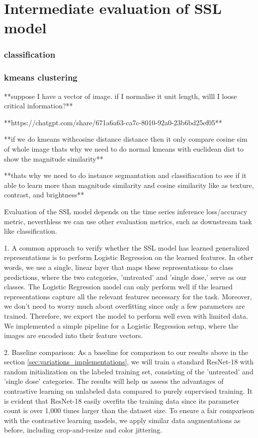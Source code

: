 \section{Intermediate evaluation of SSL model}

\subsubsection{classification}
\subsubsection{kmeans clustering}


**suppose I have a vector of image. if I normalise it unit length, willl I loose critical information?**

**https://chatgpt.com/share/671a6a63-ca7c-8010-92a0-23b6bd25ef05**

**if we do kmeans withcosine distance distance then it only compare cosine sim of whole image thats why we need to do normal kmeans with euclidean dist to show the magnitude similarity** 

**thats why we need to do instance segmantation and classifiacation to see if it able to learn more than magnitude similarity and cosine similarity like as texture, contrast, and brightness**

Evaluation of the SSL model depends on the  time series inference loss/accuracy metric, neverthless we can use other evaluation metrics, such as downstream task like classification. 

1. A common approach to verify whether the SSL model has learned generalized representations is to perform Logistic Regression on the learned features. In other words, we use a single, linear layer that maps these representations to class predictions, where the two categories, 'untreated' and 'single dose,' serve as our classes. The Logistic Regression model can only perform well if the learned representations capture all the relevant features necessary for the task. Moreover, we don't need to worry much about overfitting since only a few parameters are trained. Therefore, we expect the model to perform well even with limited data. We implemented a simple pipeline for a Logistic Regression setup, where the images are encoded into their feature vectors.

2. Baseline comparison: As a baseline for comparison  to our results above in the section \ref{sec:variations_implementations}, we will train a standard ResNet-18 with random initialization on the labeled training set, consisting of the 'untreated' and 'single dose' categories. The results will help us assess the advantages of contrastive learning on unlabeled data compared to purely supervised training. It is evident that ResNet-18 easily overfits the training data since its parameter count is over 1,000 times larger than the dataset size. To ensure a fair comparison with the contrastive learning models, we apply similar data augmentations as before, including crop-and-resize and color jittering.

